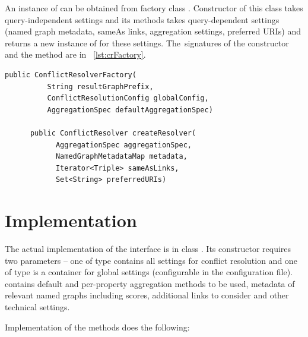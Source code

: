 An instance of  can be obtained from factory class . Constructor of this class takes query-independent settings and its  methods takes query-dependent settings (named graph metadata, sameAs links, aggregation settings, preferred URIs) and returns a new instance of  for these settings. The~signatures of the constructor and the  method are in \lstlistingname~\ref{lst:crFactory}.

\begin{lstlisting}[caption={\code{ConflictResolverFactory} interface},label=lst:crFactory]
      public ConflictResolverFactory(
          String resultGraphPrefix,
          ConflictResolutionConfig globalConfig,
          AggregationSpec defaultAggregationSpec)

      public ConflictResolver createResolver(
            AggregationSpec aggregationSpec,
            NamedGraphMetadataMap metadata,
            Iterator<Triple> sameAsLinks,
            Set<String> preferredURIs)
\end{lstlisting}

\section{Implementation}
The actual implementation of the  interface is in class . Its constructor requires two parameters -- one of type  contains all settings for conflict resolution and one of type  is a container for global settings (configurable in the \odcs configuration file).  contains default and per-property aggregation methods to be used, metadata of relevant named graphs including \QA scores, additional  links to consider and other technical settings.

Implementation of the  methods does the following:

